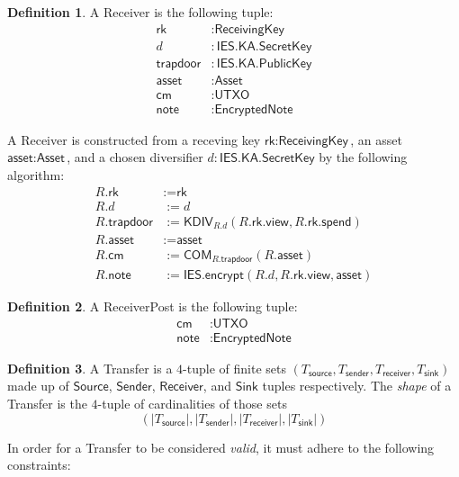 \documentclass[a4paper]{article}
\theoremstyle{definition}
\newtheorem{definition}{Definition}[subsection]
\renewcommand{\abs}[1]{\left|#1\right|}
\newcommand{\Asset}{{\textsf{Asset}}}
\newcommand{\COM}{{\textsf{COM}}}
\newcommand{\EncryptedNote}{{\textsf{EncryptedNote}}}
\newcommand{\IES}{{\textsf{IES}}}
\newcommand{\KA}{{\textsf{KA}}}
\newcommand{\KDIV}{{\textsf{KDIV}}}
\newcommand{\PublicKey}{{\textsf{PublicKey}}}
\newcommand{\ReceiverPost}{{\textsf{ReceiverPost}}}
\newcommand{\Receiver}{{\textsf{Receiver}}}
\newcommand{\ReceivingKey}{{\textsf{ReceivingKey}}}
\newcommand{\SecretKey}{{\textsf{SecretKey}}}
\newcommand{\Sender}{{\textsf{Sender}}}
\newcommand{\Sink}{{\textsf{Sink}}}
\newcommand{\Source}{{\textsf{Source}}}
\newcommand{\Transfer}{{\textsf{Transfer}}}
\newcommand{\UTXO}{{\textsf{UTXO}}}
\newcommand{\asset}{{\textsf{asset}}}
\newcommand{\cm}{{\textsf{cm}}}
\newcommand{\encrypt}{{\textsf{encrypt}}}
\newcommand{\note}{{\textsf{note}}}
\newcommand{\receiver}{{\textsf{receiver}}}
\newcommand{\rk}{{\textsf{rk}}}
\newcommand{\sender}{{\textsf{sender}}}
\newcommand{\sink}{{\textsf{sink}}}
\newcommand{\source}{{\textsf{source}}}
\newcommand{\spend}{{\textsf{spend}}}
\newcommand{\trapdoor}{{\textsf{trapdoor}}}
\newcommand{\view}{{\textsf{view}}}
\begin{document}
\begin{definition}
    A \Receiver{} is the following tuple:
    \begin{align*}
        \rk       &: \ReceivingKey \\
        d         &: \IES.\KA.\SecretKey \\
        \trapdoor &: \IES.\KA.\PublicKey \\
        \asset    &: \Asset \\
        \cm       &: \UTXO \\
        \note     &: \EncryptedNote
    \end{align*}
    
    A \Receiver{} is constructed from a receving key $\rk : \ReceivingKey$, an asset $\asset : \Asset$, and a chosen diversifier $d : \IES.\KA.\SecretKey$ by the following algorithm:
    \begin{align*}
        R.\rk       &:= \rk \\
        R.d         &:= d \\
        R.\trapdoor &:= \KDIV_{R.d}(R.\rk.\view, R.\rk.\spend) \\
        R.\asset    &:= \asset \\
        R.\cm       &:= \COM_{R.\trapdoor}(R.\asset) \\
        R.\note     &:= \IES.\encrypt(R.d, R.\rk.\view, \asset)
    \end{align*}
\end{definition}

\begin{definition}
    A \ReceiverPost{} is the following tuple:
    \begin{align*}
        \cm       &: \UTXO \\
        \note     &: \EncryptedNote
    \end{align*}
\end{definition}

\begin{definition}
    A \Transfer{} is a $4$-tuple of finite sets $(T_\source, T_\sender, T_\receiver, T_\sink)$ made up of $\Source$, $\Sender$, $\Receiver$, and $\Sink$ tuples respectively. The \emph{shape} of a \Transfer{} is the $4$-tuple of cardinalities of those sets
    \[\left(\abs{T_\source}, \abs{T_\sender}, \abs{T_\receiver}, \abs{T_\sink}\right)\]
\end{definition}

In order for a \Transfer{} to be considered \emph{valid}, it must adhere to the following constraints:
\end{document}
